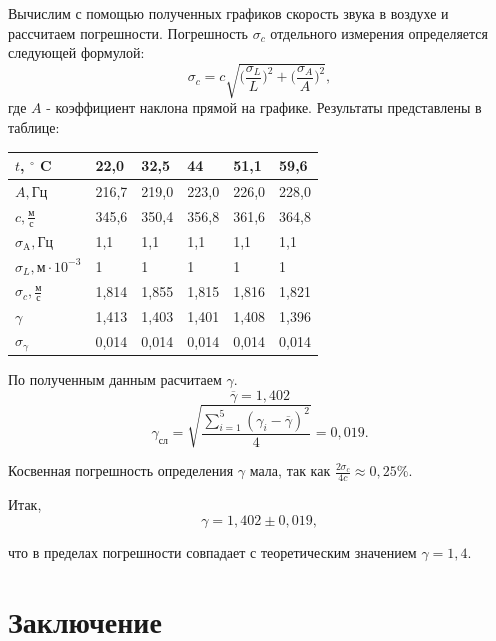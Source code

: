 \documentclass[a4paper, 12pt]{article} %
\begin{document}
    Вычислим с помощью полученных графиков скорость звука в воздухе и рассчитаем погрешности. Погрешность $\sigma_{c}$ отдельного измерения определяется следующей формулой:
    $$ \sigma_{c} =c \sqrt{\Big(\frac{\sigma_{L}}{L}\Big)^2+ \Big(\frac{\sigma_{A}}{A}\Big)^2},$$
    где $A$ - коэффициент наклона прямой на графике.
    Результаты представлены в таблице:
    \begin{center}
    \begin{tabular}{|l|l|l|l|l|l|}
        \hline
        $t$, $^\circ$ C & 22,0 & 32,5 & 44 & 51,1 & 59,6
        \\
        
        \hline
        $A,\text{Гц}$ & 216,7 & 219,0 & 223,0 & 226,0 & 228,0
        \\
        \hline
        $c,\frac{\text{м}}{\text{с}}$ & 345,6 & 350,4 & 356,8 & 361,6 & 364,8
        \\
        \hline
        $\sigma_{\text{A}},{\text{Гц}} $ & 1,1 & 1,1 & 1,1 & 1,1 & 1,1
        \\
        \hline
        $\sigma_{L},{\text{м}} \cdot 10^{-3} $ & 1 & 1 & 1 & 1 & 1 
        \\
        \hline
        $\sigma_{c},\frac{\text{м}}{\text{с}}$ & 1,814 & 1,855 & 1,815 & 1,816 & 1,821
        \\
        \hline
        $\gamma$ & 1,413 & 1,403 & 1,401 & 1,408 & 1,396
        \\
        \hline
        $\sigma_{\gamma}$ & 0,014 & 0,014 & 0,014 & 0,014 & 0,014
        \\
        \hline
    \end{tabular}
    \end{center}

    По полученным данным расчитаем $\gamma$.
    $$\overline{\gamma} = 1,402$$
    $$\gamma_{сл} = \sqrt{\frac{\sum_{i=1}^{5} (\gamma_{i}-\overline{\gamma})^2}{4}} = 0,019 .$$
    
    Косвенная погрешность определения $\gamma$ мала, так как $\frac{2\sigma_c}{4c} \approx 0,25 \%.$
    
    Итак, $$\gamma = 1,402 \pm 0,019,$$ 
    
    что в пределах погрешности совпадает  с теоретическим значением $\gamma = 1,4.$
    
    \section{Заключение}
    
\end{document}
